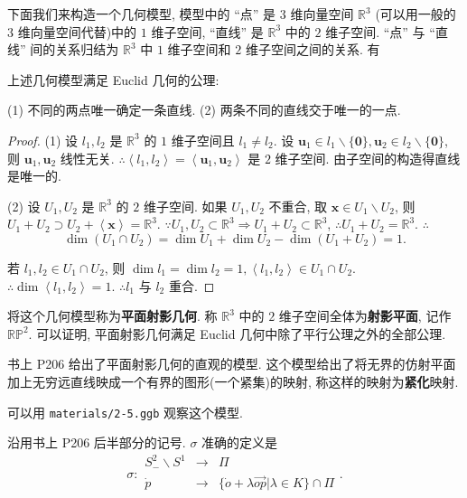 \documentclass[color=black,device=normal,lang=cn,mode=geye]{elegantnote}
\begin{document}
下面我们来构造一个几何模型, 模型中的 ``点'' 是 $3$ 维向量空间 $\mathbb{R}^3$ (可以用一般的 $3$ 维向量空间代替)中的 $1$ 维子空间, ``直线'' 是 $\mathbb{R}^3$ 中的 $2$ 维子空间. ``点'' 与 ``直线'' 间的关系归结为 $\mathbb{R}^3$ 中 $1$ 维子空间和 $2$ 维子空间之间的关系. 有
\begin{theorem}
    上述几何模型满足 Euclid 几何的公理:

    (1) 不同的两点唯一确定一条直线. (2) 两条不同的直线交于唯一的一点.
\end{theorem}
\begin{proof}
    (1) 设 $l_1,l_2$ 是 $\mathbb{R}^3$ 的 $1$ 维子空间且 $l_1\neq l_2$. 设 $\boldsymbol{u}_1\in l_1\backslash\{\boldsymbol{0}\},\boldsymbol{u}_2\in l_2\backslash\{\boldsymbol{0}\}$, 则 $\boldsymbol{u}_1,\boldsymbol{u}_2$ 线性无关. $\therefore\left<l_1,l_2\right>=\left<\boldsymbol{u}_1,\boldsymbol{u}_2\right>$ 是 $2$ 维子空间. 由子空间的构造得直线是唯一的.

    (2) 设 $U_1,U_2$ 是 $\mathbb{R}^3$ 的 $2$ 维子空间. 如果 $U_1,U_2$ 不重合, 取 $\boldsymbol{x}\in U_1\backslash U_2$, 则 $U_1+U_2\supset U_2+\left<\boldsymbol{x}\right>=\mathbb{R}^3$. $\because U_1,U_2\subset\mathbb{R}^3\Rightarrow U_1+U_2\subset\mathbb{R}^3$, $\therefore U_1+U_2=\mathbb{R}^3$. $\therefore$
    \[\dim(U_1\cap U_2)=\dim U_1+\dim U_2-\dim(U_1+U_2)=1.\]

    若 $l_1,l_2\in U_1\cap U_2$, 则 $\dim l_1=\dim l_2=1,\left<l_1,l_2\right>\in U_1\cap U_2$. $\therefore\dim\left<l_1,l_2\right>=1$. $\therefore l_1$ 与 $l_2$ 重合.
\end{proof}
将这个几何模型称为\textbf{平面射影几何}. 称 $\mathbb{R}^3$ 中的 $2$ 维子空间全体为\textbf{射影平面}, 记作 $\mathbb{RP}^2$. 可以证明, 平面射影几何满足 Euclid 几何中除了平行公理之外的全部公理.

书上 P206 给出了平面射影几何的直观的模型. 这个模型给出了将无界的仿射平面加上无穷远直线映成一个有界的图形(一个紧集)的映射, 称这样的映射为\textbf{紧化}映射.

可以用 \verb|materials/2-5.ggb| 观察这个模型.

沿用书上 P206 后半部分的记号. $\sigma$ 准确的定义是
\[\sigma:\begin{array}{rcl}
    S^2_-\backslash S^1 & \to & \varPi \\
    \dot{p} & \to & \{\dot{o}+\lambda\overrightarrow{op}|\lambda\in K\}\cap\varPi \\
\end{array}.\]
\end{document}

